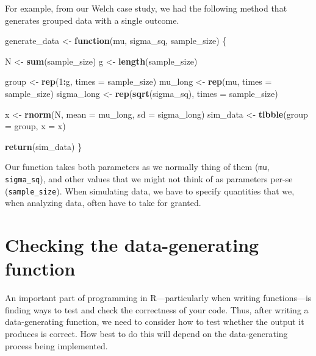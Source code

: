 \documentclass[
]{book}
\newenvironment{Shaded}{\begin{snugshade}}{\end{snugshade}}
\newcommand{\AttributeTok}[1]{\textcolor[rgb]{0.13,0.29,0.53}{#1}}
\newcommand{\ControlFlowTok}[1]{\textcolor[rgb]{0.13,0.29,0.53}{\textbf{#1}}}
\newcommand{\DecValTok}[1]{\textcolor[rgb]{0.00,0.00,0.81}{#1}}
\newcommand{\FunctionTok}[1]{\textcolor[rgb]{0.13,0.29,0.53}{\textbf{#1}}}
\newcommand{\NormalTok}[1]{#1}
\newcommand{\OtherTok}[1]{\textcolor[rgb]{0.56,0.35,0.01}{#1}}
\newcommand{\SpecialCharTok}[1]{\textcolor[rgb]{0.81,0.36,0.00}{\textbf{#1}}}
\begin{document}
For example, from our Welch case study, we had the following method that generates grouped data with a single outcome.

\begin{Shaded}
\begin{Highlighting}[]
\NormalTok{generate\_data }\OtherTok{\textless{}{-}} \ControlFlowTok{function}\NormalTok{(mu, sigma\_sq, sample\_size) \{}
  
\NormalTok{  N }\OtherTok{\textless{}{-}} \FunctionTok{sum}\NormalTok{(sample\_size) }
\NormalTok{  g }\OtherTok{\textless{}{-}} \FunctionTok{length}\NormalTok{(sample\_size) }
  
\NormalTok{  group }\OtherTok{\textless{}{-}} \FunctionTok{rep}\NormalTok{(}\DecValTok{1}\SpecialCharTok{:}\NormalTok{g, }\AttributeTok{times =}\NormalTok{ sample\_size) }
\NormalTok{  mu\_long }\OtherTok{\textless{}{-}} \FunctionTok{rep}\NormalTok{(mu, }\AttributeTok{times =}\NormalTok{ sample\_size)}
\NormalTok{  sigma\_long }\OtherTok{\textless{}{-}} \FunctionTok{rep}\NormalTok{(}\FunctionTok{sqrt}\NormalTok{(sigma\_sq), }\AttributeTok{times =}\NormalTok{ sample\_size) }
  
\NormalTok{  x }\OtherTok{\textless{}{-}} \FunctionTok{rnorm}\NormalTok{(N, }\AttributeTok{mean =}\NormalTok{ mu\_long, }\AttributeTok{sd =}\NormalTok{ sigma\_long)}
\NormalTok{  sim\_data }\OtherTok{\textless{}{-}} \FunctionTok{tibble}\NormalTok{(}\AttributeTok{group =}\NormalTok{ group, }\AttributeTok{x =}\NormalTok{ x)}
  
  \FunctionTok{return}\NormalTok{(sim\_data)}
\NormalTok{\}}
\end{Highlighting}
\end{Shaded}

Our function takes both parameters as we normally thing of them (\texttt{mu}, \texttt{sigma\_sq}), and other values that we might not think of as parameters per-se (\texttt{sample\_size}).
When simulating data, we have to specify quantities that we, when analyzing data, often have to take for granted.

\section{Checking the data-generating function}\label{checking-the-data-generating-function}

An important part of programming in R---particularly when writing functions---is finding ways to test and check the correctness of your code. Thus, after writing a data-generating function, we need to consider how to test whether the output it produces is correct. How best to do this will depend on the data-generating process being implemented.
\end{document}
